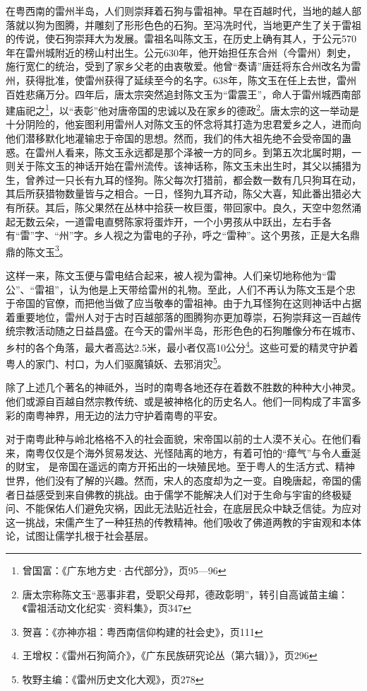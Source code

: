 在粤西南的雷州半岛，人们则崇拜着石狗与雷祖神。早在百越时代，当地的越人部落就以狗为图腾，并雕刻了形形色色的石狗。至冯冼时代，当地更产生了关于雷祖的传说，使石狗崇拜大为发展。雷祖名叫陈文玉，在历史上确有其人，于公元570年在雷州城附近的榜山村出生。公元630年，他开始担任东合州（今雷州）刺史，施行宽仁的统治，受到了家乡父老的由衷敬爱。他曾“奏请”唐廷将东合州改名为雷州，获得批准，使雷州获得了延续至今的名字。638年，陈文玉在任上去世，雷州百姓悲痛万分。四年后，唐太宗突然追封陈文玉为“雷震王”，命人于雷州城西南部建庙祀之\footnote{曾国富：《广东地方史·古代部分》，页95—96}，以“表彰”他对唐帝国的忠诚以及在家乡的德政\footnote{唐太宗称陈文玉“恶事非君，受职父母邦，德政彰明”，转引自高诚苗主编：《雷祖活动文化纪实·资料集》，页347}。唐太宗的这一举动是十分阴险的，他妄图利用雷州人对陈文玉的怀念将其打造为忠君爱乡之人，进而向他们潜移默化地灌输忠于帝国的思想。然而，我们的伟大祖先绝不会受帝国的蛊惑。在雷州人看来，陈文玉永远都是那个泽被一方的同乡。到第五次北属时期，一则关于陈文玉的神话开始在雷州流传。该神话称，陈文玉未出生时，其父以捕猎为生，曾养过一只长有九耳的怪狗。陈父每次打猎前，都会数一数有几只狗耳在动，其后所获猎物数量皆与之相合。一日，怪狗九耳齐动，陈父大喜，知此番出猎必大有所获。其后，陈父果然在丛林中拾获一枚巨蛋，带回家中。良久，天空中忽然涌起无数云朵，一道雷电直劈陈家将蛋炸开，一个小男孩从中跃出，左右手各有“雷”字、“州”字。乡人视之为雷电的子孙，呼之“雷种”。这个男孩，正是大名鼎鼎的陈文玉\footnote{贺喜：《亦神亦祖：粤西南信仰构建的社会史》，页111}。

这样一来，陈文玉便与雷电结合起来，被人视为雷神。人们亲切地称他为“雷公”、“雷祖”，认为他是上天带给雷州的礼物。至此，人们不再认为陈文玉是个忠于帝国的官僚，而把他当做了应当敬奉的雷祖神。由于九耳怪狗在这则神话中占据着重要地位，雷州人对于古时百越部落的图腾狗亦更加尊崇，石狗崇拜这一百越传统宗教活动随之日益昌盛。在今天的雷州半岛，形形色色的石狗雕像分布在城市、乡村的各个角落，最大者高达2.5米，最小者仅高10公分\footnote{王增权：《雷州石狗简介》，《广东民族研究论丛（第六辑）》，页296}。这些可爱的精灵守护着粤人的家门、村口，为人们驱魔镇妖、去邪消灾\footnote{牧野主编：《雷州历史文化大观》，页278}。

除了上述几个著名的神祗外，当时的南粤各地还存在着数不胜数的种种大小神灵。他们或源自百越自然宗教传统、或是被神格化的历史名人。他们一同构成了丰富多彩的南粤神界，用无边的法力守护着南粤的平安。

对于南粤此种与岭北格格不入的社会面貌，宋帝国以前的士人漠不关心。在他们看来，南粤仅仅是个海外贸易发达、光怪陆离的地方，有着可怕的“瘴气”与令人垂涎的财宝， 是帝国在遥远的南方开拓出的一块殖民地。至于粤人的生活方式、精神世界，他们没有了解的兴趣。然而，宋人的态度却为之一变。自晚唐起，帝国的儒者日益感受到来自佛教的挑战。由于儒学不能解决人们对于生命与宇宙的终极疑问、不能保佑人们避免灾祸，因此无法贴近社会，在底层民众中缺乏信徒。为应对这一挑战，宋儒产生了一种狂热的传教精神。他们吸收了佛道两教的宇宙观和本体论，试图让儒学扎根于社会基层。

